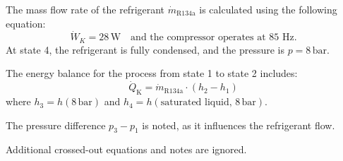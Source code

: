 The mass flow rate of the refrigerant \( \dot{m}_{\text{R134a}} \) is calculated using the following equation:  
\[
\dot{W}_K = 28 \, \text{W} \quad \text{and the compressor operates at 85 Hz.}
\]  
At state 4, the refrigerant is fully condensed, and the pressure is \( p = 8 \, \text{bar} \).  

The energy balance for the process from state 1 to state 2 includes:  
\[
\dot{Q}_{\text{K}} = \dot{m}_{\text{R134a}} \cdot (h_2 - h_1)
\]  
where \( h_3 = h(8 \, \text{bar}) \) and \( h_4 = h(\text{saturated liquid, } 8 \, \text{bar}) \).  

The pressure difference \( p_3 - p_1 \) is noted, as it influences the refrigerant flow.  

Additional crossed-out equations and notes are ignored.